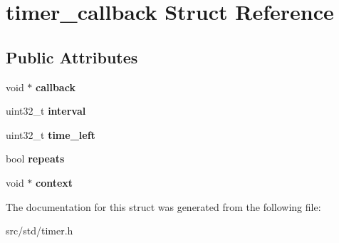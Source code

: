 \hypertarget{structtimer__callback}{}\section{timer\+\_\+callback Struct Reference}
\label{structtimer__callback}
\subsection*{Public Attributes}
\begin{DoxyCompactItemize}
\item 
\mbox{\label{structtimer__callback_a474228cb594d7227062d1e043a549c49}} 
void $\ast$ {\bfseries callback}
\item 
\mbox{\label{structtimer__callback_af9d6c5c30f9c5c636bbbb307abad12c8}} 
uint32\+\_\+t {\bfseries interval}
\item 
\mbox{\label{structtimer__callback_a13526e2699dea02b18ed259ff392e96c}} 
uint32\+\_\+t {\bfseries time\+\_\+left}
\item 
\mbox{\label{structtimer__callback_ac85d674e5a9be617a4f1917768d2b7fe}} 
bool {\bfseries repeats}
\item 
\mbox{\label{structtimer__callback_abb6ae2dc5f68b023ef51e5acf7ea83ac}} 
void $\ast$ {\bfseries context}
\end{DoxyCompactItemize}


The documentation for this struct was generated from the following file\+:\begin{DoxyCompactItemize}
\item 
src/std/timer.\+h\end{DoxyCompactItemize}
